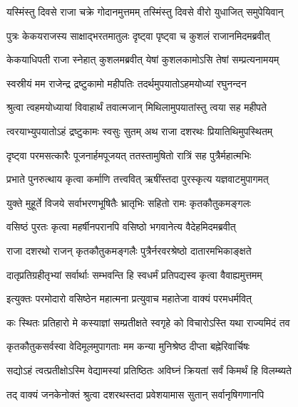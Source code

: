 
\twolineshloka
{यस्मिंस्तु दिवसे राजा चक्रे गोदानमुत्तमम्}
{तस्मिंस्तु दिवसे वीरो युधाजित् समुपेयिवान्} %

\twolineshloka
{पुत्रः केकयराजस्य साक्षाद्भरतमातुलः}
{दृष्ट्वा पृष्ट्वा च कुशलं राजानमिदमब्रवीत्} %

\twolineshloka
{केकयाधिपती राजा स्नेहात् कुशलमब्रवीत्}
{येषां कुशलकामोऽसि तेषां सम्प्रत्यनामयम्} %

\twolineshloka
{स्वस्रीयं मम राजेन्द्र द्रष्टुकामो महीपतिः}
{तदर्थमुपयातोऽहमयोध्यां रघुनन्दन} %

\twolineshloka
{श्रुत्वा त्वहमयोध्यायां विवाहार्थं तवात्मजान्}
{मिथिलामुपयातांस्तु त्वया सह महीपते} %

\twolineshloka
{त्वरयाभ्युपयातोऽहं द्रष्टुकामः स्वसुः सुतम्}
{अथ राजा दशरथः प्रियातिथिमुपस्थितम्} %

\twolineshloka
{दृष्ट्वा परमसत्कारैः पूजनार्हमपूजयत्}
{ततस्तामुषितो रात्रिं सह पुत्रैर्महात्मभिः} %

\twolineshloka
{प्रभाते पुनरुत्थाय कृत्वा कर्माणि तत्त्ववित्}
{ऋषींस्तदा पुरस्कृत्य यज्ञवाटमुपागमत्} %

\twolineshloka
{युक्ते मुहूर्ते विजये सर्वाभरणभूषितैः}
{भ्रातृभिः सहितो रामः कृतकौतुकमङ्गलः} %

\twolineshloka
{वसिष्ठं पुरतः कृत्वा महर्षीनपरानपि}
{वसिष्ठो भगवानेत्य वैदेहमिदमब्रवीत्} %

\twolineshloka
{राजा दशरथो राजन् कृतकौतुकमङ्गलैः}
{पुत्रैर्नरवरश्रेष्ठो दातारमभिकाङ्क्षते} %

\twolineshloka
{दातृप्रतिग्रहीतृभ्यां सर्वार्थाः सम्भवन्ति हि}
{स्वधर्मं प्रतिपद्यस्व कृत्वा वैवाह्यमुत्तमम्} %

\twolineshloka
{इत्युक्तः परमोदारो वसिष्ठेन महात्मना}
{प्रत्युवाच महातेजा वाक्यं परमधर्मवित्} %

\twolineshloka
{कः स्थितः प्रतिहारो मे कस्याज्ञां सम्प्रतीक्षते}
{स्वगृहे को विचारोऽस्ति यथा राज्यमिदं तव} %

\twolineshloka
{कृतकौतुकसर्वस्वा वेदिमूलमुपागताः}
{मम कन्या मुनिश्रेष्ठ दीप्ता बह्नेरिवार्चिषः} %

\twolineshloka
{सद्योऽहं त्वत्प्रतीक्षोऽस्मि वेद्यामस्यां प्रतिष्ठितः}
{अविघ्नं क्रियतां सर्वं किमर्थं हि विलम्ब्यते} %

\twolineshloka
{तद् वाक्यं जनकेनोक्तं श्रुत्वा दशरथस्तदा}
{प्रवेशयामास सुतान् सर्वानृषिगणानपि} %

